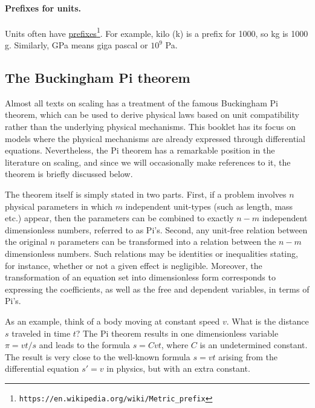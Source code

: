 \documentclass[graybox,envcountchap,sectrefs,final]{svmonodo}
\begin{document}
\noindent
\paragraph{Prefixes for units.}
Units often have \href{{https://en.wikipedia.org/wiki/Metric_prefix}}{prefixes}\footnote{\texttt{https://en.wikipedia.org/wiki/Metric\_prefix}}.
For example, kilo (k) is a prefix for 1000,
so kg is 1000 g. Similarly, GPa means giga pascal or $10^9$ Pa.

\subsection{The Buckingham Pi theorem}
\label{scale:dimunit:Pi}


Almost all texts on scaling has a treatment of the famous Buckingham
Pi theorem, which can be used to derive physical laws based on unit
compatibility rather than the underlying physical mechanisms.  This
booklet has its focus on models where the physical mechanisms are
already expressed through differential equations. Nevertheless, the Pi
theorem has a remarkable position in the literature on scaling, and
since we will occasionally make references to it, the theorem is
briefly discussed below.

The theorem itself is simply stated in two parts. First, if a problem
involves $n$ physical parameters in which $m$ independent unit-types
(such as length, mass etc.) appear, then the parameters can be
combined to exactly $n-m$ independent dimensionless numbers, referred
to as Pi's. Second, any unit-free relation between the original $n$
parameters can be transformed into a relation between the $n-m$
dimensionless numbers.  Such relations may be identities or
inequalities stating, for instance, whether or not a given effect is
negligible. Moreover, the transformation of an equation set into
dimensionless form corresponds to expressing the coefficients, as well
as the free and dependent variables, in terms of Pi's.

As an example, think of a body moving at constant speed $v$. What
is the distance $s$ traveled in time $t$? The Pi theorem results in
one dimensionless variable $\pi = vt/s$ and leads to the formula
$s = Cvt$, where $C$ is an undetermined constant. The result is
very close to the well-known formula $s=vt$ arising from the differential
equation $s'=v$ in physics, but with an extra constant.
\end{document}
